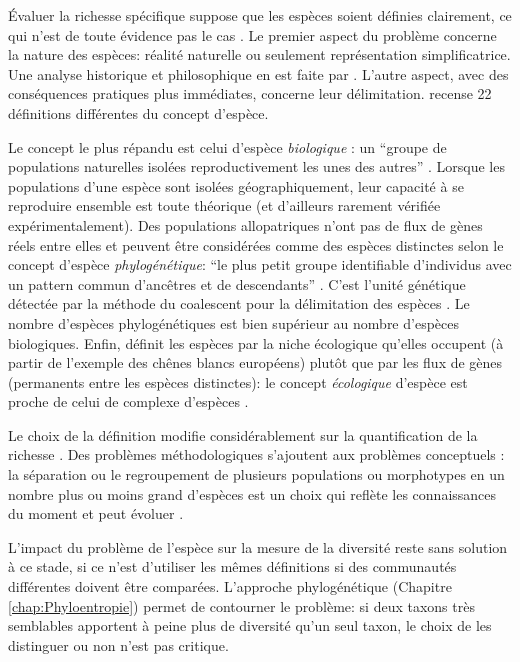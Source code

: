 \documentclass[
  11pt,
  french,
  a4paper,
  extrafontsizes,onecolumn,openright
  ]{memoir}
\begin{document}
Évaluer la richesse spécifique suppose que les espèces soient définies clairement, ce qui n'est de toute évidence pas le cas \autocite{Casetta2014a}.
Le premier aspect du problème concerne la nature des espèces: réalité naturelle ou seulement représentation simplificatrice.
Une analyse historique et philosophique en est faite par \textcite{Richards2010}.
L'autre aspect, avec des conséquences pratiques plus immédiates, concerne leur délimitation.
\textcite{Mayden1997} recense 22 définitions différentes du concept d'espèce.

Le concept le plus répandu est celui d'espèce \emph{biologique} \autocite{Dobzhansky1937}: un ``groupe de populations naturelles isolées reproductivement les unes des autres'' \autocite{Mayr1942}.
Lorsque les populations d'une espèce sont isolées géographiquement, leur capacité à se reproduire ensemble est toute théorique (et d'ailleurs rarement vérifiée expérimentalement).
Des populations allopatriques n'ont pas de flux de gènes réels entre elles et peuvent être considérées comme des espèces distinctes selon le concept d'espèce \emph{phylogénétique}: ``le plus petit groupe identifiable d'individus avec un pattern commun d'ancêtres et de descendants'' \autocite{Cracraft1983}.
C'est l'unité génétique détectée par la méthode du coalescent pour la délimitation des espèces \autocite{Sukumaran2017}.
Le nombre d'espèces phylogénétiques est bien supérieur au nombre d'espèces biologiques.
Enfin, \textcite{VanValen1976} définit les espèces par la niche écologique qu'elles occupent (à partir de l'exemple des chênes blancs européens) plutôt que par les flux de gènes (permanents entre les espèces distinctes): le concept \emph{écologique} d'espèce est proche de celui de complexe d'espèces \autocite[ensemble d'espèces voisines échangeant des gènes,][]{Pernes1984}.

Le choix de la définition modifie considérablement sur la quantification de la richesse \autocite{Agapow2004}.
Des problèmes méthodologiques s'ajoutent aux problèmes conceptuels \autocite{Hey2001}: la séparation ou le regroupement de plusieurs populations ou morphotypes en un nombre plus ou moins grand d'espèces est un choix qui reflète les connaissances du moment et peut évoluer \autocite{Barberousse2014}.

L'impact du problème de l'espèce sur la mesure de la diversité reste sans solution à ce stade, si ce n'est d'utiliser les mêmes définitions si des communautés différentes doivent être comparées.
L'approche phylogénétique (Chapitre \ref{chap:Phyloentropie}) permet de contourner le problème: si deux taxons très semblables apportent à peine plus de diversité qu'un seul taxon, le choix de les distinguer ou non n'est pas critique.
\end{document}
